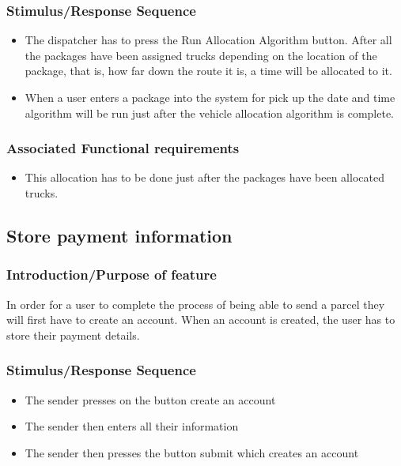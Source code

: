 \documentclass[paper=a4, fontsize=11pt]{scrartcl} %
\numberwithin{equation}{section} %
\numberwithin{figure}{section} %
\numberwithin{table}{section} %
\begin{document}
\subsubsection{Stimulus/Response Sequence}
\begin{itemize}
			\item The dispatcher has to press the Run Allocation Algorithm button. After all the packages have been assigned trucks depending on the location of the package, that is, how far down the route it is, a time will be allocated to it.  
			\item When a user enters a package into the system for pick up the date and time algorithm will be run just after the vehicle allocation algorithm is complete.
\end{itemize}
	 

\subsubsection{Associated Functional requirements}

\begin{itemize}
			\item This allocation has to be done just after the packages have been allocated trucks. 
\end{itemize}

	

\subsection{Store payment information}
\subsubsection{Introduction/Purpose of feature}
In order for a user to complete the process of being able to send a parcel they will first have to create an account. When an account is created, the user has to store their payment details.
\subsubsection{Stimulus/Response Sequence}
\begin{itemize}
			\item The sender presses on the button create an account 
			\item The sender then enters all their information 
			\item The sender then presses the button submit which creates an account 
\end{itemize}
	
\end{document}
